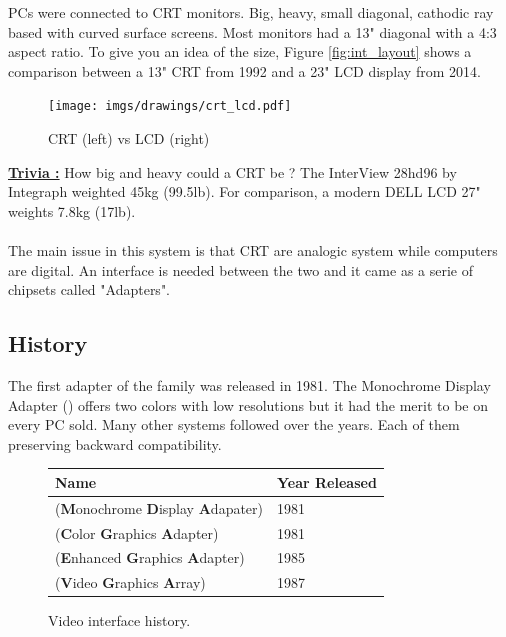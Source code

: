\documentclass[book.tex]{subfiles}
\begin{document}
PCs were connected to CRT monitors. Big, heavy, small diagonal, cathodic ray based with curved surface screens. Most monitors had a 13" diagonal with a 4:3 aspect ratio. To give you an idea of the size, Figure \ref{fig:int_layout} shows a comparison between a 13" CRT from 1992 and a 23" LCD display from 2014.\\

\begin{figure}[H]
\centering
\texttt{[image: imgs/drawings/crt\_lcd.pdf]}
\caption{CRT (left) vs LCD (right)}
\label{fig:lcd_vs_crt}
\end{figure}

\textbf{\underline{Trivia :}} How big and heavy could a CRT be ? The InterView 28hd96 by Integraph weighted 45kg (99.5lb). For comparison, a modern DELL LCD 27" weights 7.8kg (17lb).\\
\\
The main issue in this system is that CRT are analogic system while computers are digital. An interface is needed between the two and it came as a serie of chipsets called "Adapters". 

  \subsection{History}

The first adapter of the family was released in 1981. The Monochrome Display
   Adapter () offers two colors with low resolutions but it had the merit to be on every PC sold. Many other systems followed over the years. Each of them preserving backward compatibility.
\bigskip
  
 \begin{figure}[H]
\centering  
\begin{tabularx}{\textwidth}{ X  Y }
  \toprule
  \textbf{Name} &  \textbf{Year Released} \\
  \toprule {}
   (\textbf{M}onochrome
   \textbf{D}isplay
   \textbf{A}dapater) & 1981 
   \\ 
   (\textbf{C}olor
   \textbf{G}raphics
   \textbf{A}dapter) & 1981 
    \\ 
   (\textbf{E}nhanced
   \textbf{G}raphics
   \textbf{A}dapter) & 1985
   \\ 
   (\textbf{V}ideo
   \textbf{G}raphics
   \textbf{A}rray)  & 1987
    \\
  \toprule
\end{tabularx}
\caption{Video interface history.}\label{fig:vga_history}
\end{figure}
\end{document}
